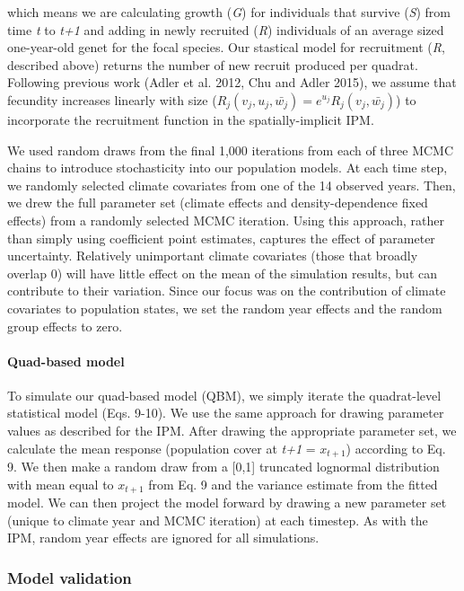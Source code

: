 \documentclass[12pt,]{article}
\begin{document}
which means we are calculating growth (\emph{G}) for individuals that
survive (\emph{S}) from time \emph{t} to \emph{t+1} and adding in newly
recruited (\emph{R}) individuals of an average sized one-year-old genet
for the focal species. Our stastical model for recruitment (\emph{R},
described above) returns the number of new recruit produced per quadrat.
Following previous work (Adler et al. 2012, Chu and Adler 2015), we
assume that fecundity increases linearly with size
(\(R_j(v_{j},u_{j},\bar{w_{j}}) = e^{u_j}R_j(v_{j},\bar{w_{j}})\)) to
incorporate the recruitment function in the spatially-implicit IPM.

We used random draws from the final 1,000 iterations from each of three
MCMC chains to introduce stochasticity into our population models. At
each time step, we randomly selected climate covariates from one of the
14 observed years. Then, we drew the full parameter set (climate effects
and density-dependence fixed effects) from a randomly selected MCMC
iteration. Using this approach, rather than simply using coefficient
point estimates, captures the effect of parameter uncertainty.
Relatively unimportant climate covariates (those that broadly overlap 0)
will have little effect on the mean of the simulation results, but can
contribute to their variation. Since our focus was on the contribution
of climate covariates to population states, we set the random year
effects and the random group effects to zero.

\paragraph{Quad-based model}\label{quad-based-model}

To simulate our quad-based model (QBM), we simply iterate the
quadrat-level statistical model (Eqs. 9-10). We use the same approach
for drawing parameter values as described for the IPM. After drawing the
appropriate parameter set, we calculate the mean response (population
cover at \emph{t+1} = \(x_{t+1}\)) according to Eq. 9. We then make a
random draw from a {[}0,1{]} truncated lognormal distribution with mean
equal to \(x_{t+1}\) from Eq. 9 and the variance estimate from the
fitted model. We can then project the model forward by drawing a new
parameter set (unique to climate year and MCMC iteration) at each
timestep. As with the IPM, random year effects are ignored for all
simulations.

\subsubsection{Model validation}\label{model-validation}
\end{document}
